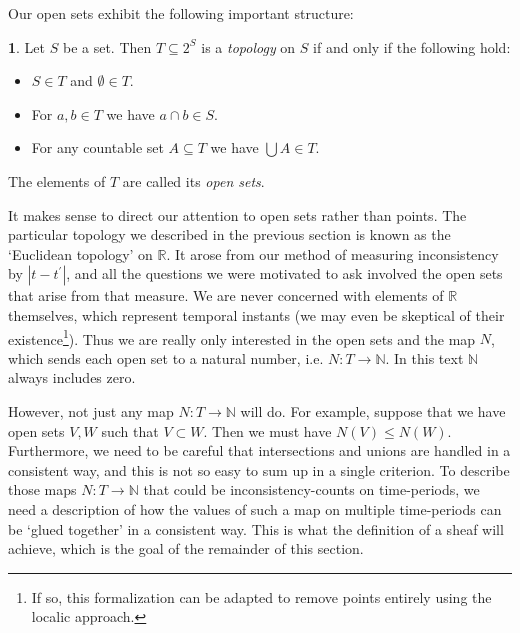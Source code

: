 \documentclass[oneside,english]{article}
\theoremstyle{plain}
\theoremstyle{definition}
\newtheorem{defn}[thm]{\protect\definitionname}
\theoremstyle{definition}
\providecommand{\definitionname}{Definition}
\begin{document}
Our open sets exhibit the following important structure:
\begin{defn}
	Let $S$ be a set. Then $T\subseteq 2^S$ is a \emph{topology} on $S$ if and only if the following hold:
	\begin{itemize}
		\item $S\in T$ and $\emptyset \in T$.
		\item For $a, b\in T$ we have $a\cap b\in S$.
		\item For any countable set $A\subseteq T$ we have $\bigcup A\in T$.
	\end{itemize}
	The elements of $T$ are called its \emph{open sets}.
\end{defn}
It makes sense to direct our attention to open sets rather than points. The particular topology we described in the previous section is known as the `Euclidean topology' on $\mathbb{R}$. It arose from our method of measuring inconsistency by $|t-t^\prime |$, and all the questions we were motivated to ask involved the open sets that arise from that measure. We are never concerned with elements of $\mathbb{R}$ themselves, which represent temporal instants (we may even be skeptical of their existence\footnote{If so, this formalization can be adapted to remove points entirely using the localic approach.}). Thus we are really only interested in the open sets and the map $N$, which sends each open set to a natural number, i.e. $N:T\to \mathbb{N}$. In this text $\mathbb{N}$ always includes zero. 

However, not just any map $N:T\to \mathbb{N}$ will do. For example, suppose that we have open sets $V, W$ such that $V\subset W$. Then we must have $N(V)\le N(W)$. Furthermore, we need to be careful that intersections and unions are handled in a consistent way, and this is not so easy to sum up in a single criterion. To describe those maps $N:T\to \mathbb{N}$ that could be inconsistency-counts on time-periods, we need a description of how the values of such a map on multiple time-periods can be `glued together' in a consistent way. This is what the definition of a sheaf will achieve, which is the goal of the remainder of this section.
\end{document}
